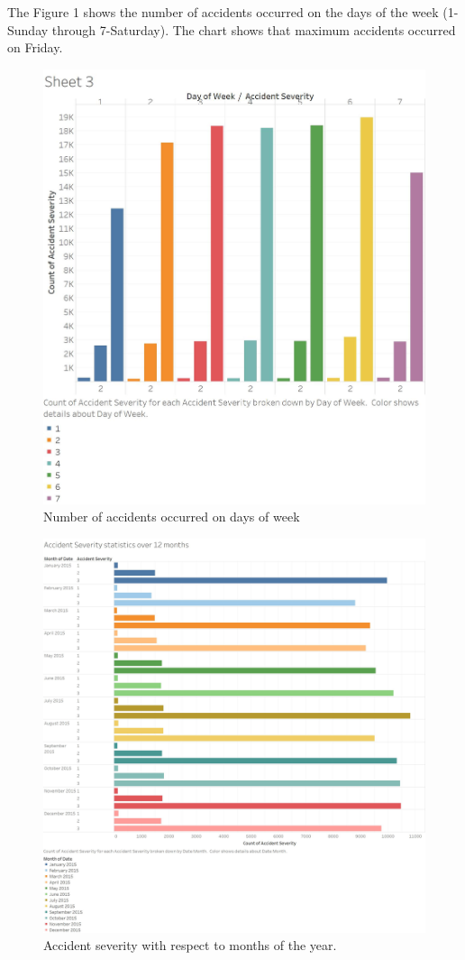 \documentclass{acm_proc_article-sp}
\begin{document}
The Figure 1 shows the number of accidents occurred on the days of the week (1-Sunday through 7-Saturday). The chart shows that maximum accidents occurred on Friday.

\begin{figure}
      \includegraphics[width=1.0\columnwidth]{images/daysofweek.jpg}
  \caption{Number of accidents occurred on days of week}
\end{figure}

\begin{figure}
  \centering
      \includegraphics[width=1.0\textwidth]{images/bar.jpg}
  \caption{Accident severity with respect to months of the year.}
\end{figure}
\end{document}

